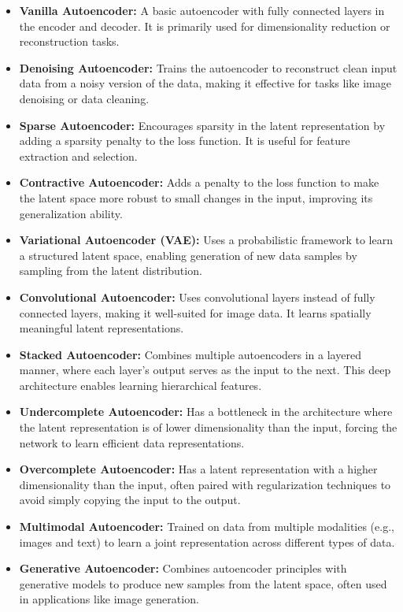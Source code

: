 \begin{itemize}
    \item \textbf{Vanilla Autoencoder:} A basic autoencoder with fully connected layers in the encoder and decoder. It is primarily used for dimensionality reduction or reconstruction tasks.

    \item \textbf{Denoising Autoencoder:} Trains the autoencoder to reconstruct clean input data from a noisy version of the data, making it effective for tasks like image denoising or data cleaning.

    \item \textbf{Sparse Autoencoder:} Encourages sparsity in the latent representation by adding a sparsity penalty to the loss function. It is useful for feature extraction and selection.

    \item \textbf{Contractive Autoencoder:} Adds a penalty to the loss function to make the latent space more robust to small changes in the input, improving its generalization ability.

    \item \textbf{Variational Autoencoder (VAE):} Uses a probabilistic framework to learn a structured latent space, enabling generation of new data samples by sampling from the latent distribution.

    \item \textbf{Convolutional Autoencoder:} Uses convolutional layers instead of fully connected layers, making it well-suited for image data. It learns spatially meaningful latent representations.

    \item \textbf{Stacked Autoencoder:} Combines multiple autoencoders in a layered manner, where each layer’s output serves as the input to the next. This deep architecture enables learning hierarchical features.

    \item \textbf{Undercomplete Autoencoder:} Has a bottleneck in the architecture where the latent representation is of lower dimensionality than the input, forcing the network to learn efficient data representations.

    \item \textbf{Overcomplete Autoencoder:} Has a latent representation with a higher dimensionality than the input, often paired with regularization techniques to avoid simply copying the input to the output.

    \item \textbf{Multimodal Autoencoder:} Trained on data from multiple modalities (e.g., images and text) to learn a joint representation across different types of data.

    \item \textbf{Generative Autoencoder:} Combines autoencoder principles with generative models to produce new samples from the latent space, often used in applications like image generation.
\end{itemize}

